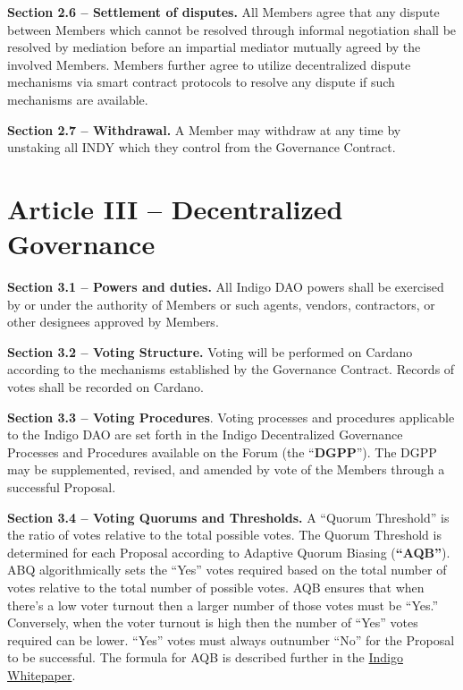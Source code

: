 \textbf{Section 2.6 -- Settlement of disputes.} All Members agree that
any dispute between Members which cannot be resolved through informal
negotiation shall be resolved by mediation before an impartial mediator
mutually agreed by the involved Members. Members further agree to
utilize decentralized dispute mechanisms via smart contract protocols to
resolve any dispute if such mechanisms are available.

\textbf{Section 2.7 -- Withdrawal.} A Member may withdraw at any time by
unstaking all INDY which they control from the Governance Contract.

\hypertarget{article-iii-decentralized-governance}{%
\section{Article III -- Decentralized
Governance}\label{article-iii-decentralized-governance}}

\textbf{Section 3.1 -- Powers and duties.} All Indigo DAO powers shall
be exercised by or under the authority of Members or such agents,
vendors, contractors, or other designees approved by Members.

\textbf{Section 3.2 -- Voting Structure.} Voting will be performed on
Cardano according to the mechanisms established by the Governance
Contract. Records of votes shall be recorded on Cardano.

\textbf{Section 3.3 -- Voting Procedures}. Voting processes and
procedures applicable to the Indigo DAO are set forth in the Indigo
Decentralized Governance Processes and Procedures available on the Forum
(the ``\textbf{DGPP}''). The DGPP may be supplemented, revised, and
amended by vote of the Members through a successful Proposal.

\textbf{Section 3.4 -- Voting Quorums and Thresholds.} A ``Quorum
Threshold'' is the ratio of votes relative to the total possible votes.
The Quorum Threshold is determined for each Proposal according to
Adaptive Quorum Biasing (\textbf{``AQB''}). ABQ algorithmically sets the
``Yes'' votes required based on the total number of votes relative to
the total number of possible votes. AQB ensures that when there's a low
voter turnout then a larger number of those votes must be ``Yes.''
Conversely, when the voter turnout is high then the number of ``Yes''
votes required can be lower. ``Yes'' votes must always outnumber ``No''
for the Proposal to be successful. The formula for AQB is described
further in the \href{https://indigoprotocol.io/whitepaper}{Indigo
Whitepaper}.

